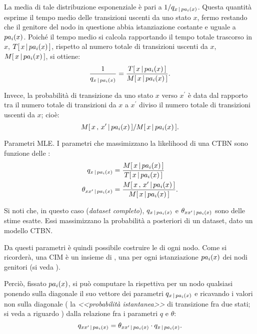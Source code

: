 La media di tale distribuzione esponenziale è pari a $1/q_{x\,\arrowvert\,pa_i(\mathnormal{x})}$. Questa quantità esprime il tempo medio delle transizioni uscenti da uno stato $x$, fermo restando che il genitore del nodo in questione abbia istanziazione costante e uguale a $pa_i(\mathnormal{x})$. Poiché il tempo medio si calcola rapportando il tempo totale trascorso in $x$, $T[\,x\,\arrowvert\,pa_i(\mathnormal{x})\,]$, rispetto al numero totale di transizioni uscenti da $x$, $\mstat{x\,\arrowvert\,pa_i(\setel{x})}$, si ottiene:
\[
\frac{1}{q_{x\,\arrowvert\,pa_i(\setel{x})}}=\frac{\tstat{x\,\arrowvert\,pa_i(\setel{x})}}{\mstat{x\,\arrowvert\,pa_i(\setel{x})}}\text{.}
\]

Invece, la probabilità di transizione da uno stato $x$ verso $x^\prime$ è data dal rapporto tra il numero totale di transizioni da $x$ a $x^\prime$ diviso il numero totale di transizioni uscenti da $x$; cioè:
\[
\mstat[x]{x^\prime\,\arrowvert\,pa_i(\setel{x})}/\mstat{x\,\arrowvert\,pa_i(\setel{x})}\text{.}
\]

\begin{teorema}{Parametri \ac{MLE}.}
I parametri che massimizzano la likelihood di una \acl{CTBN} sono funzione delle \stats{}:
\begin{equation}
\label{eq:ctbn-params}
\begin{split}
q_{x\,\arrowvert\,pa_i(\setel{x})}&=\frac{\mstat{x\,\arrowvert\,pa_i(\setel{x})}}{\tstat{x\,\arrowvert\,pa_i(\setel{x})}} \\
\theta_{xx^\prime\,\arrowvert\,pa_i(\setel{x})}&=\frac{\mstat[x]{x^\prime\,\arrowvert\,pa_i(\setel{x})}}{\mstat{x\,\arrowvert\,pa_i(\setel{x})}}\text{.}
\end{split}
\end{equation}
\end{teorema}
Si noti che, in questo caso (\emph{dataset completo}), $q_{x\,\arrowvert\,pa_i(\mathnormal{x})}$ e $\theta_{xx^\prime\,\arrowvert\,pa_i(\mathnormal{x})}$ sono delle stime esatte. Essi massimizzano la probabilità a posteriori di un dataset, dato un modello \acs{CTBN}.

Da questi parametri è quindi possibile costruire le \cim{} di ogni nodo. Come si ricorderà, una \acs{CIM} è un insieme di \im{}, una per ogni istanziazione $pa_i(\mathnormal{x})$ dei nodi genitori (si veda ).

Perciò, fissato $pa_i(\mathnormal{x})$, si può computare la rispettiva \im*{} per un nodo qualsiasi ponendo sulla diagonale il suo vettore dei parametri $q_{x\,\arrowvert\,pa_i(\mathnormal{x})}$ e ricavando i valori non sulla diagonale (\ie{} la \emph{<<probabilità istantanea>>} di transizione fra due stati; si veda a riguardo ) dalla relazione fra i parametri $q$ e $\theta$:
\begin{equation}
\label{eq:ctbn-params-rel}
q_{xx^\prime\,\arrowvert\,pa_i(\mathnormal{x})}=\theta_{xx^\prime\,\arrowvert\,pa_i(\mathnormal{x})} \cdot q_{x\,\arrowvert\,pa_i(\mathnormal{x})}\text{.}
\end{equation}





